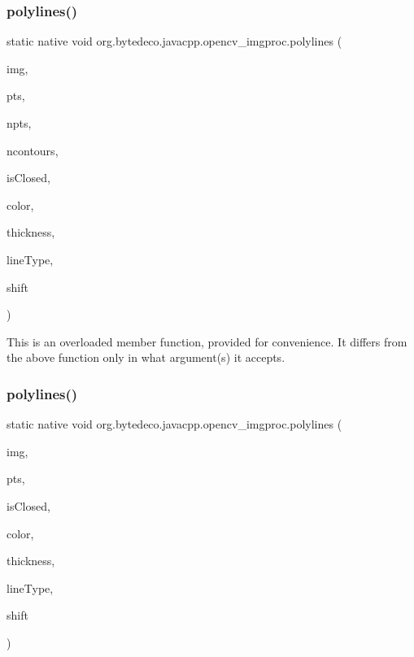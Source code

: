 \subsubsection{\texorpdfstring{polylines()}{polylines()}\hspace{0.1cm}{\footnotesize\ttfamily [1/2]}}
{\footnotesize\ttfamily static native void org.\+bytedeco.\+javacpp.\+opencv\+\_\+imgproc.\+polylines (\begin{DoxyParamCaption}\item[{@By\+Ref Mat}]{img,  }\item[{@Cast(\char`\"{}const cv\+::\+Point$\ast$const$\ast$\char`\"{}) Pointer\+Pointer}]{pts,  }\item[{@Const Int\+Pointer}]{npts,  }\item[{int}]{ncontours,  }\item[{@Cast(\char`\"{}bool\char`\"{}) boolean}]{is\+Closed,  }\item[{@Const @By\+Ref Scalar}]{color,  }\item[{int}]{thickness,  }\item[{int}]{line\+Type,  }\item[{int}]{shift }\end{DoxyParamCaption})\hspace{0.3cm}{\ttfamily [static]}}

This is an overloaded member function, provided for convenience. It differs from the above function only in what argument(s) it accepts. \mbox{\label{group__imgproc__draw_ga00ed857a005204839489574ac441f9c6}} 
\subsubsection{\texorpdfstring{polylines()}{polylines()}\hspace{0.1cm}{\footnotesize\ttfamily [2/2]}}
{\footnotesize\ttfamily static native void org.\+bytedeco.\+javacpp.\+opencv\+\_\+imgproc.\+polylines (\begin{DoxyParamCaption}\item[{@By\+Val Mat}]{img,  }\item[{@By\+Val Mat\+Vector}]{pts,  }\item[{@Cast(\char`\"{}bool\char`\"{}) boolean}]{is\+Closed,  }\item[{@Const @By\+Ref Scalar}]{color,  }\item[{int}]{thickness,  }\item[{int}]{line\+Type,  }\item[{int}]{shift }\end{DoxyParamCaption})\hspace{0.3cm}{\ttfamily [static]}}



